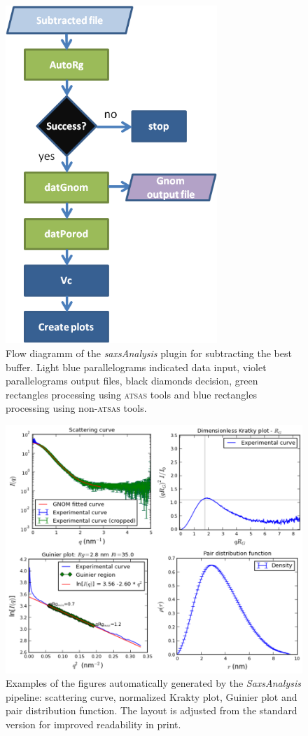 \documentclass[preprint,pdf]{iucr}              %
\begin{document}
\begin{figure}
\centering
\includegraphics[width=8cm]{analysis.png}%
\caption{Flow diagramm of the \textit{saxsAnalysis} plugin for subtracting the best buffer. Light blue parallelograms indicated data input, violet  parallelograms output files, black diamonds decision, green rectangles processing using \textsc{atsas} tools and blue rectangles processing using non-\textsc{atsas} tools. }
\label{fgr:analysis}
\end{figure}

\begin{figure}
\centering
\includegraphics[width=18cm]{autoplot.png}
\caption{Examples of the figures automatically generated by the
\textit{SaxsAnalysis} pipeline: scattering curve, normalized Krakty plot, Guinier plot and pair distribution function. 
The layout is adjusted from the standard version for improved readability in
print.}
\label{plots}
\end{figure}
\end{document}
